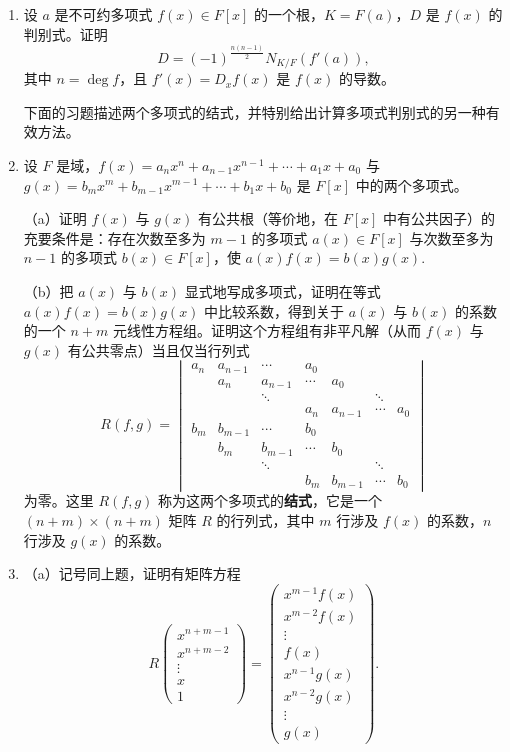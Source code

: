 \begin{enumerate}
\item 设 \(a\) 是不可约多项式 \(f(x) \in F[x]\) 的一个根，\(K = F(a)\)，\(D\) 是 \(f(x)\) 的判别式。证明
\[
D = (-1)^{\frac{n(n-1)}{2}}N_{K/F}(f'(a)),
\]
其中 \(n = \deg f\)，且 \(f'(x) = D_xf(x)\) 是 \(f(x)\) 的导数。

\noindent 下面的习题描述两个多项式的结式，并特别给出计算多项式判别式的另一种有效方法。

\item 设 \(F\) 是域，\(f(x) = a_nx^n+a_{n-1}x^{n-1}+\cdots+a_1x+a_0\) 与 \(g(x) = b_mx^m+b_{m-1}x^{m-1}+\cdots+b_1x+b_0\) 是 \(F[x]\) 中的两个多项式。

（a）证明 \(f(x)\) 与 \(g(x)\) 有公共根（等价地，在 \(F[x]\) 中有公共因子）的充要条件是：存在次数至多为 \(m-1\) 的多项式 \(a(x) \in F[x]\) 与次数至多为 \(n-1\) 的多项式 \(b(x) \in F[x]\)，使 \(a(x)f(x) = b(x)g(x)\).

（b）把 \(a(x)\) 与 \(b(x)\) 显式地写成多项式，证明在等式 \(a(x)f(x) = b(x)g(x)\) 中比较系数，得到关于 \(a(x)\) 与 \(b(x)\) 的系数的一个 \(n+m\) 元线性方程组。证明这个方程组有非平凡解（从而 \(f(x)\) 与 \(g(x)\) 有公共零点）当且仅当行列式
\[
R(f,g) = \begin{vmatrix}
a_n & a_{n-1} & \cdots & a_0 & & & \\
& a_n & a_{n-1} & \cdots & a_0 & & \\
& & \ddots & & & \ddots & \\
& & & a_n & a_{n-1} & \cdots & a_0\\
b_m & b_{m-1} & \cdots & b_0 & & & \\
& b_m & b_{m-1} & \cdots & b_0 & & \\
& & \ddots & & & \ddots & \\
& & & b_m & b_{m-1} & \cdots & b_0
\end{vmatrix}
\]
为零。这里 \(R(f,g)\) 称为这两个多项式的\textbf{结式}，它是一个 \((n+m) \times (n+m)\) 矩阵 \(R\) 的行列式，其中 \(m\) 行涉及 \(f(x)\) 的系数，\(n\) 行涉及 \(g(x)\) 的系数。

\item （a）记号同上题，证明有矩阵方程
\[
R\begin{pmatrix} x^{n+m-1}\\ x^{n+m-2}\\ \vdots\\ x\\ 1\end{pmatrix} = \begin{pmatrix} x^{m-1}f(x)\\ x^{m-2}f(x)\\ \vdots\\ f(x)\\ x^{n-1}g(x)\\ x^{n-2}g(x)\\ \vdots\\ g(x)\end{pmatrix}.
\]


\end{enumerate}
